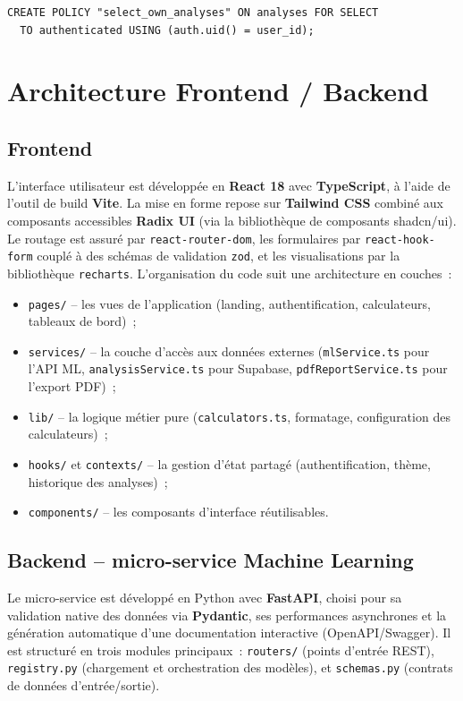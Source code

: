 \begin{lstlisting}
CREATE POLICY "select_own_analyses" ON analyses FOR SELECT
  TO authenticated USING (auth.uid() = user_id);
\end{lstlisting}

\section{Architecture Frontend / Backend}

\subsection{Frontend}
L'interface utilisateur est développée en \textbf{React 18} avec \textbf{TypeScript}, à l'aide de l'outil de build \textbf{Vite}. La mise en forme repose sur \textbf{Tailwind CSS} combiné aux composants accessibles \textbf{Radix UI} (via la bibliothèque de composants shadcn/ui). Le routage est assuré par \texttt{react-router-dom}, les formulaires par \texttt{react-hook-form} couplé à des schémas de validation \texttt{zod}, et les visualisations par la bibliothèque \texttt{recharts}. L'organisation du code suit une architecture en couches~:

\begin{itemize}[label=\textbullet,font=\normalsize]
    \item \texttt{pages/} -- les vues de l'application (landing, authentification, calculateurs, tableaux de bord)~;
    \item \texttt{services/} -- la couche d'accès aux données externes (\texttt{mlService.ts} pour l'API ML, \texttt{analysisService.ts} pour Supabase, \texttt{pdfReportService.ts} pour l'export PDF)~;
    \item \texttt{lib/} -- la logique métier pure (\texttt{calculators.ts}, formatage, configuration des calculateurs)~;
    \item \texttt{hooks/} et \texttt{contexts/} -- la gestion d'état partagé (authentification, thème, historique des analyses)~;
    \item \texttt{components/} -- les composants d'interface réutilisables.
\end{itemize}

\subsection{Backend -- micro-service Machine Learning}
Le micro-service est développé en Python avec \textbf{FastAPI}, choisi pour sa validation native des données via \textbf{Pydantic}, ses performances asynchrones et la génération automatique d'une documentation interactive (OpenAPI/Swagger). Il est structuré en trois modules principaux~: \texttt{routers/} (points d'entrée REST), \texttt{registry.py} (chargement et orchestration des modèles), et \texttt{schemas.py} (contrats de données d'entrée/sortie).

